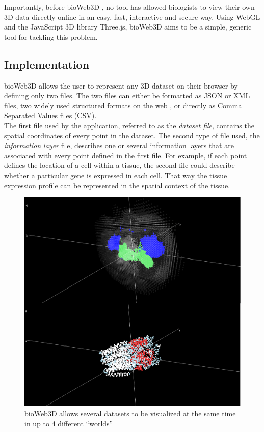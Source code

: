 Importantly, before bioWeb3D \citep{Pettit13}, no tool has allowed biologists to view their own 3D data directly online in an easy, fast, interactive and secure way. Using WebGL and the JavaScript 3D library Three.js, bioWeb3D aims to be a simple, generic tool for tackling this problem.\\

	\subsection{Implementation}

bioWeb3D allows the user to represent any 3D dataset on their browser by defining only two files. The two files can either be formatted as JSON or XML files, two widely used structured formats on the web \citep{Wilde07}, or directly as Comma Separated Values files (CSV).\\

The first file used by the application, referred to as the \emph{dataset file}, contains the spatial coordinates of every point in the dataset. The second type of file used, the \emph{information layer} file, describes one or several information layers that are associated with every point defined in the first file. For example, if each point defines the location of a cell within a tissue, the second file could describe whether a particular gene is expressed in each cell. That way the tissue expression profile can be represented in the spatial context of the tissue.\\

\begin{figure}[bth]
\begin{center}
  \includegraphics[width=0.8\linewidth]{gfx/chapter3/two_worlds.png}
\end{center}
  \caption{bioWeb3D allows several datasets to be visualized at the same time in up to 4 different ``worlds''}
  \label{fig:2worlds}
\end{figure}


